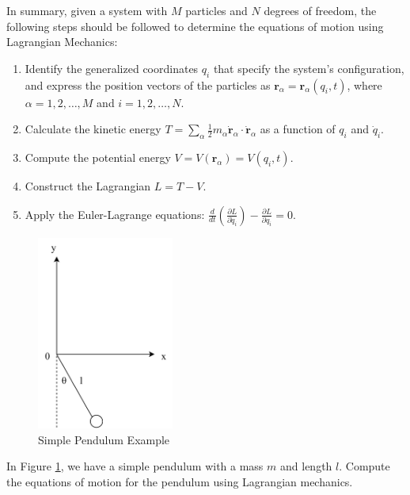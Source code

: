 In summary, given a system with $M$ particles and $N$ degrees of freedom, the following 
steps should be followed to determine the equations of motion using Lagrangian Mechanics:

\begin{enumerate}
    \item Identify the generalized coordinates $q_i$ that specify the system's 
    configuration, and express the position vectors of the particles as 
    $\mathbf{r}_\alpha=\mathbf{r}_\alpha(q_i, t)$, where $\alpha = 1, 2, \dots, M$ and 
    $i = 1, 2, \dots, N$.
    \item Calculate the kinetic energy 
    $T = \sum_\alpha \frac{1}{2} m_\alpha \dot{\mathbf{r}}_\alpha \cdot \dot{\mathbf{r}}_\alpha$ 
    as a function of $q_i$ and $\dot{q}_i$.
    \item Compute the potential energy $V = V(\mathbf{r}_\alpha) = V(q_i, t)$.
    \item Construct the Lagrangian $L = T - V$.
    \item Apply the Euler-Lagrange equations: 
    $\frac{d}{dt} \left(\frac{\partial L}{\partial \dot{q}_i}\right) - \frac{\partial L}{\partial q_i} = 0$.
\end{enumerate}

\begin{figure}[ht]
    \centering
    \includegraphics[width=0.4\textwidth]{images/2-1-1.png}
    \caption{Simple Pendulum Example}
    \label{fig:2-1-1}
\end{figure}

\begin{example}
    In Figure \ref{fig:2-1-1}, we have a simple pendulum with a mass $m$ and length $l$.
    Compute the equations of motion for the pendulum using Lagrangian mechanics.
    \label{ex:2-1}
\end{example}

